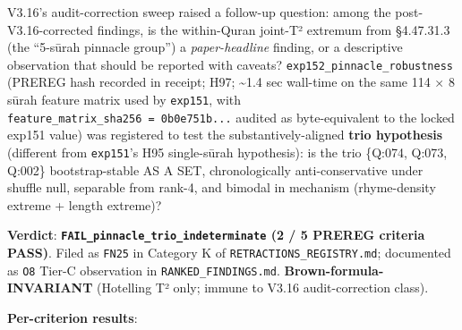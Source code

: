 \documentclass[
]{article}
\begin{document}
V3.16's audit-correction sweep raised a follow-up question: among the
post-V3.16-corrected findings, is the within-Quran joint-T² extremum
from §4.47.31.3 (the ``5-sūrah pinnacle group'') a \emph{paper-headline}
finding, or a descriptive observation that should be reported with
caveats? \texttt{exp152\_pinnacle\_robustness} (PREREG hash recorded in
receipt; H97; \textasciitilde1.4 sec wall-time on the same 114 × 8 sūrah
feature matrix used by \texttt{exp151}, with
\texttt{feature\_matrix\_sha256\ =\ 0b0e751b...} audited as
byte-equivalent to the locked exp151 value) was registered to test the
substantively-aligned \textbf{trio hypothesis} (different from
\texttt{exp151}'s H95 single-sūrah hypothesis): is the trio \{Q:074,
Q:073, Q:002\} bootstrap-stable AS A SET, chronologically
anti-conservative under shuffle null, separable from rank-4, and bimodal
in mechanism (rhyme-density extreme + length extreme)?

\textbf{Verdict}: \textbf{\texttt{FAIL\_pinnacle\_trio\_indeterminate}
(2 / 5 PREREG criteria PASS)}. Filed as \texttt{FN25} in Category K of
\texttt{RETRACTIONS\_REGISTRY.md}; documented as \texttt{O8} Tier-C
observation in \texttt{RANKED\_FINDINGS.md}.
\textbf{Brown-formula-INVARIANT} (Hotelling T² only; immune to V3.16
audit-correction class).

\textbf{Per-criterion results}:
\end{document}
